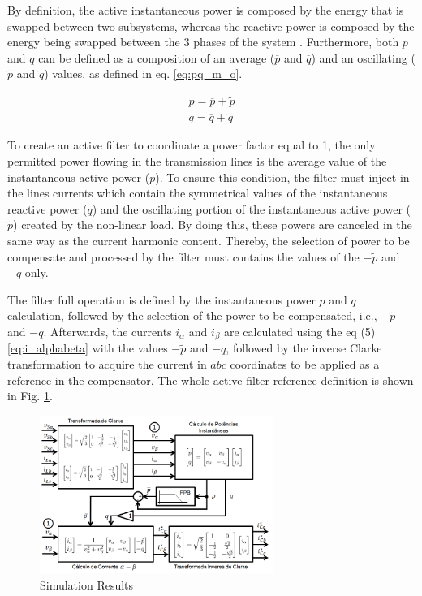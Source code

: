 By definition, the active instantaneous power is composed by the energy that is swapped between two subsystems, whereas the reactive power is composed by the energy being swapped between the 3 phases of the system \cite{Akagi1984,Peng1996}. Furthermore, both $p$ and $q$ can be defined as a composition of an average ($\overline{p}$ and $\overline{q}$) and an oscillating ($\tilde{p}$ and $\tilde{q}$) values, as defined in eq. \ref{eq:pq_m_o}.

\begin{equation}
\begin{aligned}
p = \overline{p} + \tilde{p}\\
q = \overline{q} + \tilde{q} 
\end{aligned}
\label{eq:pq_m_o}
\end{equation} 

To create an active filter to coordinate a power factor equal to 1, the only permitted power flowing in the transmission lines is the average value of the instantaneous active power ($\overline{p}$). To ensure this condition, the filter must inject in the lines currents which contain the symmetrical values of the instantaneous reactive power ($q$) and the oscillating portion of the instantaneous active power ($\tilde{p}$) created by the non-linear load. By doing this, these powers are canceled in the same way as the current harmonic content. Thereby, the selection of power to be compensate and processed by the filter must contains the values of the $-\tilde{p}$ and $-q$ only.

The filter full operation is defined by the instantaneous power $p$ and $q$ calculation, followed by the selection of the power to be compensated, i.e., $-\tilde{p}$ and $-q$. Afterwards, the currents $i_{\alpha}$ and $i_{\beta}$ are calculated using the eq (5) \ref{eq:i_alphabeta} with the values $-\tilde{p}$ and $-q$, followed by the inverse Clarke transformation to acquire the current in $abc$ coordinates to be applied as a reference in the compensator. The whole active filter reference definition is shown in Fig. \ref{fig:diagrama_filtro.png}.


\begin{figure}[!th]
	\centering
	\includegraphics[width=3in]{Figures/diagrama_filtro.png}
	\caption{Simulation Results}
	\label{fig:diagrama_filtro.png}
\end{figure}

